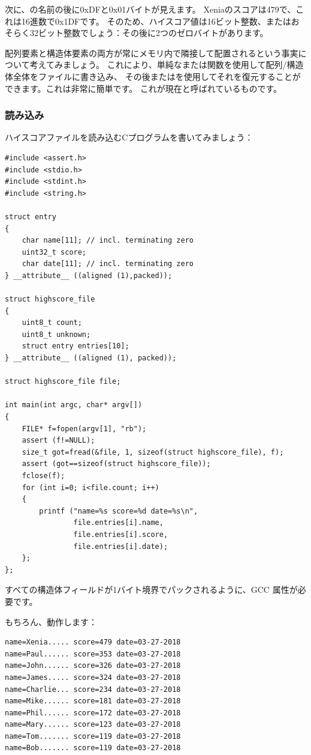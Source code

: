 次に、の名前の後に0xDFと0x01バイトが見えます。
Xeniaのスコアは479で、これは16進数で0x1DFです。
そのため、ハイスコア値は16ビット整数、またはおそらく32ビット整数でしょう：その後に2つのゼロバイトがあります。

配列要素と構造体要素の両方が常にメモリ内で隣接して配置されるという事実について考えてみましょう。
これにより、単純なまたは関数を使用して配列/構造体全体をファイルに書き込み、
その後またはを使用してそれを復元することができます。これは非常に簡単です。
これが現在と呼ばれているものです。

\subsubsection{読み込み}

ハイスコアファイルを読み込むCプログラムを書いてみましょう：

\begin{lstlisting}[style=customc]
#include <assert.h>
#include <stdio.h>
#include <stdint.h>
#include <string.h>

struct entry
{
	char name[11]; // incl. terminating zero
	uint32_t score;
	char date[11]; // incl. terminating zero
} __attribute__ ((aligned (1),packed));

struct highscore_file
{
	uint8_t count;
	uint8_t unknown;
	struct entry entries[10];
} __attribute__ ((aligned (1), packed));

struct highscore_file file;

int main(int argc, char* argv[])
{
	FILE* f=fopen(argv[1], "rb");
	assert (f!=NULL);
	size_t got=fread(&file, 1, sizeof(struct highscore_file), f);
	assert (got==sizeof(struct highscore_file));
	fclose(f);
	for (int i=0; i<file.count; i++)
	{
		printf ("name=%s score=%d date=%s\n",
				file.entries[i].name,
				file.entries[i].score,
				file.entries[i].date);
	};
};
\end{lstlisting}

すべての構造体フィールドが1バイト境界でパックされるように、GCC 属性が必要です。

もちろん、動作します：

\begin{lstlisting}
name=Xenia..... score=479 date=03-27-2018
name=Paul...... score=353 date=03-27-2018
name=John...... score=326 date=03-27-2018
name=James..... score=324 date=03-27-2018
name=Charlie... score=234 date=03-27-2018
name=Mike...... score=181 date=03-27-2018
name=Phil...... score=172 date=03-27-2018
name=Mary...... score=123 date=03-27-2018
name=Tom....... score=119 date=03-27-2018
name=Bob....... score=119 date=03-27-2018
\end{lstlisting}

